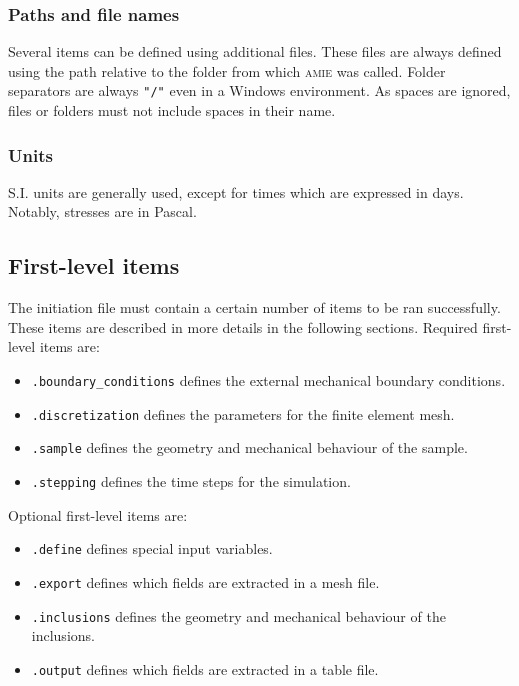 \documentclass[10pt]{article}
\newcommand{\amie}{\textsc{amie}\xspace}
\begin{document}
\subsubsection*{Paths and file names}

Several items can be defined using additional files.
These files are always defined using the path relative to the folder from which \amie was called.
Folder separators are always \verb+"/"+ even in a Windows environment.
As spaces are ignored, files or folders must not include spaces in their name.

\subsubsection*{Units}

S.I. units are generally used, except for times which are expressed in days.
Notably, stresses are in Pascal.

\subsection{First-level items}

The initiation file must contain a certain number of items to be ran successfully.
These items are described in more details in the following sections.
Required first-level items are:\\

\begin{itemize}[label=]
	\item \verb+.boundary_conditions+ defines the external mechanical boundary conditions.
	\item \verb+.discretization+ defines the parameters for the finite element mesh.
	\item \verb+.sample+ defines the geometry and mechanical behaviour of the sample.
	\item \verb+.stepping+ defines the time steps for the simulation.\\
\end{itemize}

Optional first-level items are:\\

\begin{itemize}[label=]
	\item \verb+.define+ defines special input variables.
	\item \verb+.export+ defines which fields are extracted in a mesh file.
	\item \verb+.inclusions+ defines the geometry and mechanical behaviour of the inclusions.
	\item \verb+.output+ defines which fields are extracted in a table file.
\end{itemize}
\end{document}
